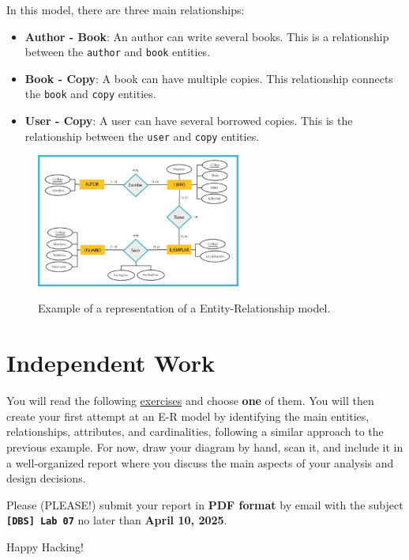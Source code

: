 \documentclass{article}
\begin{document}
In this model, there are three main relationships:

\begin{itemize}
    \item \textbf{Author - Book}: An author can write several books. This is a relationship between the \texttt{author} and \texttt{book} entities.

    \item \textbf{Book - Copy}: A book can have multiple copies. This relationship connects the \texttt{book} and \texttt{copy} entities.

    \item \textbf{User - Copy}: A user can have several borrowed copies. This is the relationship between the \texttt{user} and \texttt{copy} entities.
\end{itemize}

\begin{figure}
	\centering
	\includegraphics[width=0.6\textwidth]{figures/entidad-relacion-ejemplo2.jpg}
	\label{fig:erexample2}
	\caption{Example of a representation of a Entity-Relationship model.}
\end{figure}

\section{Independent Work}
You will read the following \href{https://drive.google.com/file/d/1TOvNSZZsybj1skLCpOxLtpr8b5A3Zb_6/view?usp=sharing}{exercises} and choose \textbf{one} of them. You will then create your first attempt at an E-R model by identifying the main entities, relationships, attributes, and cardinalities, following a similar approach to the previous example. For now, draw your diagram by hand, scan it, and include it in a well-organized report where you discuss the main aspects of your analysis and design decisions.

Please (PLEASE!) submit your report in \textbf{PDF format} by email with the subject {\LARGE \texttt{\textbf{[DBS] Lab 07}}} no later than \textbf{April 10, 2025}.

\vspace{5mm}
Happy Hacking! 
\end{document}
